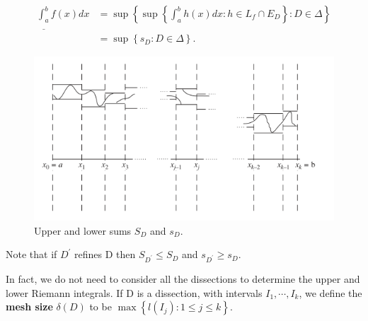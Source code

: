 \documentclass[12pt]{book}
\theoremstyle{definition}\newtheorem{dfn}{Définition}[chapter]
\theoremstyle{plain}\newtheorem{thm}{Théorème}[chapter]
\theoremstyle{plain}\newtheorem{prp}{Proposition}[chapter]
\theoremstyle{plain}\newtheorem{lem}{\bf Lemme}[chapter]
\theoremstyle{plain}\newtheorem{axm}{\bf Axiome}[chapter]
\theoremstyle{plain}\newtheorem{lmm}{\bf Lemme}[chapter]
\theoremstyle{plain}\newtheorem{exm}{\bf Example}[chapter]
\theoremstyle{plain}\newtheorem{cor}{\bf Corollaire}[chapter]
\theoremstyle{remark}\newtheorem{rem}{Remarque}[chapter]
\begin{document}
$$\begin{aligned}
\underline{\int^b_a}f(x) dx &=\sup\left\{\sup\left\{
\int^b_ah(x) dx : h \in L_f \cap E_D\right\} : D \in \Delta\right\}\\
&=\sup\left\{s_D : D \in \Delta\right\}.
\end{aligned}$$
\begin{figure}[H]
  \centering
  \includegraphics[width=0.8\linewidth]{image//Integration//1}
  \caption{Upper and lower sums $S_D$ and $s_D$.}
\end{figure}
Note that if $D^{\prime}$ refines D then $S_{D^{\prime}} \le S_D$ and $s_{D^{\prime}} \ge s_D$.

In fact, we do not need to consider all the dissections to determine the
upper and lower Riemann integrals. If D is a dissection, with intervals
$I_1, \cdots, I_k$, we define the {\bf mesh size} $\delta(D)$ to be $\max\left\{l(I_j) : 1 \le j \le k\right\}$.
\end{document}

